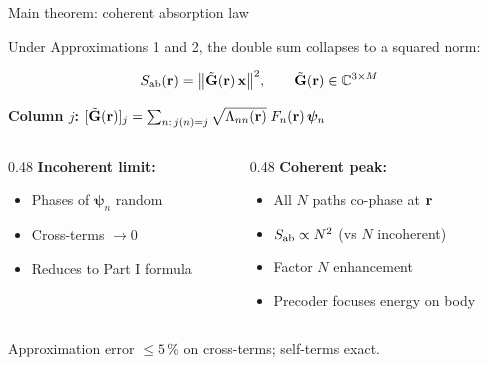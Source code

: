\begin{frame}[label=app-p3-theorem]{Main theorem: coherent absorption law}

  Under Approximations 1 and 2, the double sum collapses to a squared norm:

  \begin{resultbox}
    \vspace{-6pt}
    \[
      S_{\mathrm{ab}}(\mathbf{r}) = \bigl\|\tilde{\mathbf{G}}(\mathbf{r})\,\mathbf{x}\bigr\|^2,
      \qquad
      \tilde{\mathbf{G}}(\mathbf{r}) \in \mathbb{C}^{3 \times M}
    \]
    \vspace{-6pt}
  \end{resultbox}

  \vspace{2pt}
  \textbf{Column $j$:}\;
  $[\tilde{\mathbf{G}}(\mathbf{r})]_j = \sum_{n:\, j(n) = j}
    \sqrt{\Lambda_{nn}(\mathbf{r})}\; F_n(\mathbf{r})\,\bm{\psi}_n$

  \vspace{4pt}
  {\small
  \begin{columns}[T]
    \begin{column}{0.48\textwidth}
      \textbf{Incoherent limit:}
      \begin{itemize}\setlength\itemsep{1pt}
        \item Phases of $\bm{\psi}_n$ random
        \item Cross-terms $\to 0$
        \item Reduces to Part I formula
      \end{itemize}
    \end{column}

    \begin{column}{0.48\textwidth}
      \textbf{Coherent peak:}
      \begin{itemize}\setlength\itemsep{1pt}
        \item All $N$ paths co-phase at $\mathbf{r}$
        \item $S_{\mathrm{ab}} \propto N^2$ (vs $N$ incoherent)
        \item Factor $N$ enhancement
        \item Precoder focuses energy on body
      \end{itemize}
    \end{column}
  \end{columns}
  }

  \vspace{4pt}
  {\footnotesize Approximation error $\le 5\,\%$ on cross-terms; self-terms exact.}

  \vspace{2pt}
\end{frame}

